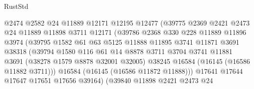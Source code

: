\begin{lexlean}{RustStd}
\begin{coremodule}
                              @2474
                              @2582
                              @24
                              @11889
                              @12171
                              @12195
                              @12477
                              (@39775
                                @2369
                                @2421
                                @2473
                                @24
                                @11889
                                @11898
                                @3711
                                @12171
                                (@39786
                                  @2368
                                  @330
                                  @228
                                  @11889
                                  @11896
                                  @3974
                                  (@39795
                                    @1582
                                    @61
                                    @63
                                    @5125
                                    @11888
                                    @11895
                                    @3741
                                    @11871
                                    @3691
                                    @38318
                                    (@39794
                                      @1580
                                      @116
                                      @61
                                      @14
                                      @8878
                                      @3711
                                      @3704
                                      @3741
                                      @11881
                                      @3691
                                      (@38278 @1579 @8878 @32001 @32005)
                                      @38245
                                      @16584
                                      (@16145 (@16586 @11882 @3711)))
                                    @16584
                                    (@16145 (@16586 @11872 @11888)))
                                  @17641
                                  @17644
                                  @17647
                                  @17651
                                  @17656
                                  @39164)
                                (@39840
                                  @11898
                                  @2421
                                  @2473
                                  @24

\end{coremodule}
\end{lexlean}
